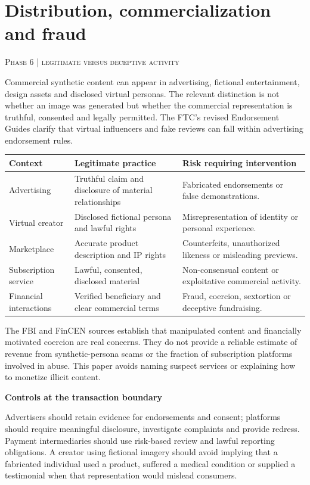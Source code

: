 \documentclass[11pt,a4paper]{article}
\newcommand{\sect}[2]{\section{#1}\textcolor{muted}{\small\textsc{#2}}\par\vspace{2mm}}
\newcommand{\sub}[1]{\vspace{1mm}\textbf{#1}\par}
\begin{document}
\clearpage\sect{Distribution, commercialization and fraud}{Phase 6 | legitimate versus deceptive activity}

Commercial synthetic content can appear in advertising, fictional entertainment, design assets and disclosed virtual personas. The relevant distinction is not whether an image was generated but whether the commercial representation is truthful, consented and legally permitted. The FTC's revised Endorsement Guides clarify that virtual influencers and fake reviews can fall within advertising endorsement rules. \cite{ftcads}


\begin{center}\small\begin{tabularx}{\linewidth}{@{}YYY@{}}\toprule
\textbf{Context} & \textbf{Legitimate practice} & \textbf{Risk requiring intervention}\\\midrule
Advertising & Truthful claim and disclosure of material relationships & Fabricated endorsements or false demonstrations.\\
Virtual creator & Disclosed fictional persona and lawful rights & Misrepresentation of identity or personal experience.\\
Marketplace & Accurate product description and IP rights & Counterfeits, unauthorized likeness or misleading previews.\\
Subscription service & Lawful, consented, disclosed material & Non-consensual content or exploitative commercial activity.\\
Financial interactions & Verified beneficiary and clear commercial terms & Fraud, coercion, sextortion or deceptive fundraising.\\\bottomrule\end{tabularx}\end{center}

The FBI and FinCEN sources establish that manipulated content and financially motivated coercion are real concerns. They do not provide a reliable estimate of revenue from synthetic-persona scams or the fraction of subscription platforms involved in abuse. This paper avoids naming suspect services or explaining how to monetize illicit content. \cite{fbi,fincen}


\sub{Controls at the transaction boundary}

Advertisers should retain evidence for endorsements and consent; platforms should require meaningful disclosure, investigate complaints and provide redress. Payment intermediaries should use risk-based review and lawful reporting obligations. A creator using fictional imagery should avoid implying that a fabricated individual used a product, suffered a medical condition or supplied a testimonial when that representation would mislead consumers.
\end{document}

